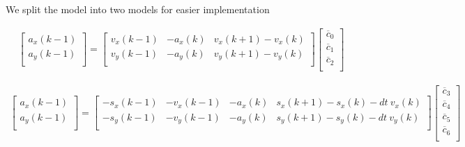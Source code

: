 \documentclass[10pt]{article}         %
\begin{document}
We split the model into two models for easier implementation

\begin{align}
    \begin{bmatrix}
        a_x(k-1) \\ 
        a_y(k-1) \\ 
    \end{bmatrix}
    =
    \begin{bmatrix}
        v_x(k-1)   & - a_x(k) &  v_x(k+1) - v_x(k) \\
        v_y(k-1)   & - a_y(k) &  v_y(k+1) - v_y(k) \\
    \end{bmatrix}
    \begin{bmatrix}
        \overline c_0 \\
        \overline c_1 \\
        \overline c_2 \\
   \end{bmatrix}
\end{align}

\begin{align}
    \begin{bmatrix}
        a_x(k-1) \\ 
        a_y(k-1) \\ 
    \end{bmatrix}
    =
    \begin{bmatrix}
        - s_x(k-1) & - v_x(k-1) & -  a_x(k)  &s_x(k+1) - s_x(k) - dt \  v_x(k) \\
        - s_y(k-1) & - v_y(k-1) & -  a_y(k)  &s_y(k+1) - s_y(k) - dt \  v_y(k) \\
    \end{bmatrix}
    \begin{bmatrix}
        \overline c_3 \\
        \overline c_4 \\
        \overline c_5 \\
        \overline c_6 \\
   \end{bmatrix}
\end{align}
\end{document}
